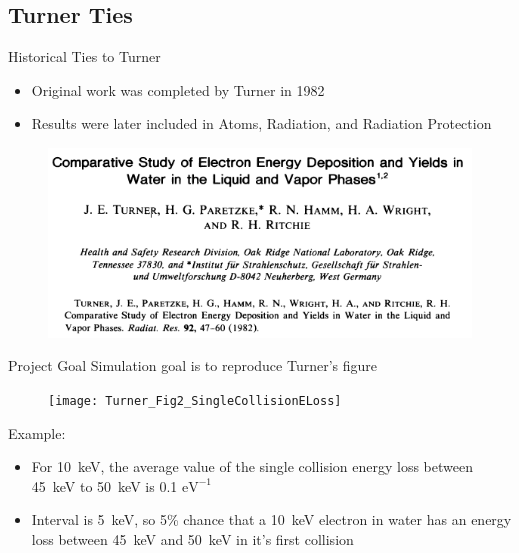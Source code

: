 \documentclass[compress]{beamer}
\begin{document}
\subsection{Turner Ties}
\begin{frame}{Historical Ties to Turner}
  \begin{itemize}
    \item Original work was completed by Turner in 1982
    \item Results were later included in Atoms, Radiation, and Radiation Protection
  \end{itemize}
    \begin{figure}
      \centering
      \includegraphics[width=0.75\textheight]{TurnerArticleHeading}
    \end{figure}
\end{frame}
\begin{frame}{Project Goal}
  \centering
  Simulation goal is to reproduce Turner's figure
  \begin{figure}
    \texttt{[image: Turner\_Fig2\_SingleCollisionELoss]}
  \end{figure}
  \flushleft
  \small
  Example:
  \begin{itemize}
    \tiny
    \item For \SI{10}{\keV}, the average value of the single collision energy loss between \SI{45}{\keV} to \SI{50}{\keV} is 0.1 $\text{eV}^{-1}$
    \item Interval is \SI{5}{\keV}, so 5\% chance that a \SI{10}{\keV} electron in water has an energy loss between \SI{45}{\keV} and \SI{50}{\keV} in it's first collision
  \end{itemize}
\end{frame}
\end{document}
